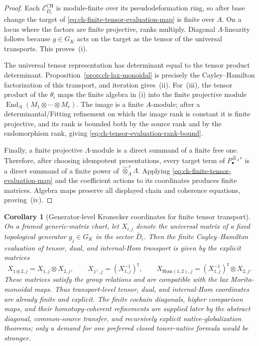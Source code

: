 \documentclass[11pt]{article}
\newtheorem{corollary}[theorem]{Corollary}
\theoremstyle{definition}
\begin{document}
\begin{proof}
Each $\mathcal E^{\mathrm{CH}}_{\bar D_i}$ is module-finite over its
pseudodeformation ring, so after base change the target of
\eqref{eq:ch-finite-tensor-evaluation-map} is finite over $A$.  On a locus
where the factors are finite projective, ranks multiply.  Diagonal
$\Lambda$-linearity follows because $g\in G_K$ acts on the target as the tensor
of the universal transports.  This proves~(i).

The universal tensor representation has determinant equal to the tensor
product determinant.  Proposition~\ref{prop:ch-lax-monoidal} is precisely the
Cayley--Hamilton factorization of this transport, and iteration gives~(ii).
For~(iii), the tensor product of the $\theta_i$ maps the finite algebra in
(i) into the finite projective module
$\operatorname{End}_A(M_1\otimes\cdots\otimes M_r)$.  The image is a finite
$A$-module; after a determinantal/Fitting refinement on which the image rank
is constant it is finite projective, and its rank is bounded both by the
source rank and by the endomorphism rank,
giving \eqref{eq:ch-tensor-evaluation-rank-bound}.

Finally, a finite projective $\Lambda$-module is a direct summand of a finite
free one.  Therefore, after choosing idempotent presentations, every target
term of $P_\bullet^{\widehat\otimes_A r}$ is a direct summand of a finite power
of $\widehat\otimes_A^{\,r}\Lambda$.  Applying
\eqref{eq:ch-finite-tensor-evaluation-map} and the coefficient actions to its
coordinates produces finite matrices.  Algebra maps preserve all displayed
chain and coherence equations, proving~(iv).
\end{proof}

\begin{corollary}[Generator-level Kronecker coordinates for finite tensor transport]\label{cor:ch-kronecker-tensor-coordinates}
On a framed generic-matrix chart, let $X_{i,j}$ denote the universal matrix of
a fixed topological generator $g_j\in G_K$ in the sector $\bar D_i$.  Then the
finite Cayley--Hamilton evaluation of tensor, dual, and internal-Hom transport
is given by the explicit matrices
\begin{equation}\label{eq:ch-kronecker-generator-formulas}
 X_{1\otimes2,j}=X_{1,j}\otimes X_{2,j},
 \qquad
 X_{1^\vee,j}=(X_{1,j}^{-1})^{\mathsf t},
 \qquad
 X_{\underline{\mathrm{Hom}}(1,2),j}
 =(X_{1,j}^{-1})^{\mathsf t}\otimes X_{2,j}.
\end{equation}
These matrices satisfy the group relations and are compatible with the lax
Morita-monoidal maps.  Thus transport-level tensor, dual, and internal-Hom coordinates are already finite and explicit.  The finite cochain diagonals, higher comparison maps, and their homotopy-coherent refinements are supplied later by the abstract diagonal, common-source transfer, and recursively explicit native-globalization theorems; only a demand for one preferred closed tower-native formula would be stronger.
\end{corollary}
\end{document}
